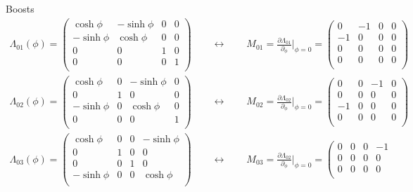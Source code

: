 \documentclass[../main.tex]{subfiles}
\begin{document}
\begin{itemize}
Boosts
\begin{align}
\Lambda_{01}(\phi)=\left(\begin{matrix}
\cosh\phi & -\sinh\phi & 0 & 0 \\
-\sinh\phi & \cosh\phi & 0 & 0 \\
0 & 0 & 1&0\\
0 & 0 & 0&1\\
\end{matrix}
\right)\qquad\leftrightarrow\qquad M_{01}=\frac{\partial \Lambda_{01}}{\partial_\phi}|_{\phi=0}=\left(\begin{matrix}
0 & -1 & 0 & 0 \\
-1 & 0 & 0 & 0 \\
0 & 0  & 0 & 0\\
0 & 0  & 0 & 0\\
\end{matrix}
\right)\\
\Lambda_{02}(\phi)=\left(\begin{matrix}
\cosh\phi & 0 & -\sinh\phi & 0 \\
0         & 1 &         0 & 0 \\
-\sinh\phi& 0 & \cosh\phi & 0\\
0         & 0 & 0         & 1\\
\end{matrix}
\right)\qquad\leftrightarrow\qquad M_{02}=\frac{\partial \Lambda_{02}}{\partial_\phi}|_{\phi=0}=\left(\begin{matrix}
0 & 0 & -1 & 0 \\
0 & 0 & 0 & 0 \\
-1 & 0  & 0 & 0\\
0 & 0  & 0 & 0\\
\end{matrix}
\right)\\
\Lambda_{03}(\phi)=\left(\begin{matrix}
\cosh\phi & 0 & 0 & -\sinh\phi \\
0         & 1 &         0 & 0 \\
0         & 0 & 1         & 0\\
-\sinh\phi& 0 & 0 & \cosh\phi\\
\end{matrix}
\right)\qquad\leftrightarrow\qquad M_{03}=\frac{\partial \Lambda_{02}}{\partial_\phi}|_{\phi=0}=\left(\begin{matrix}
0 & 0 & 0 & -1 \\
0 & 0 & 0 & 0 \\
0 & 0  & 0 & 0\\

\end{matrix}
\end{align}
\end{itemize}
\end{document}

